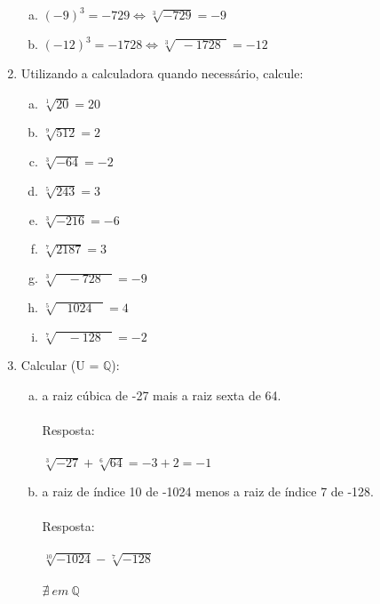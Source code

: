 \documentclass[a4paper,14pt]{article}
\begin{document}
\begin{multicols}{2}
\begin{enumerate}
\begin{enumerate}[a)]
        	\item $(-9)^3 = -729 \Leftrightarrow \sqrt[3]{-729} = -9$
        	\item $(-12)^3 = -1728 \Leftrightarrow \sqrt[3]{~~-1728~~} = -12$
        \end{enumerate}
        \item Utilizando a calculadora quando necessário, calcule:
        \begin{enumerate}[a)]
        	\item $\sqrt[1]{20} = 20$
        	\item $\sqrt[9]{512} = 2$
        	\item $\sqrt[3]{-64} = -2$
        	\item $\sqrt[5]{243} = 3$
        	\item $\sqrt[3]{-216} = -6$
        	\item $\sqrt[7]{2187} = 3$
        	\item $\sqrt[3]{~~~~-728~~~~} = -9$
        	\item $\sqrt[5]{~~~~1024~~~~} = 4$
        	\item $\sqrt[7]{~~~~-128~~~~} = -2$
        \end{enumerate}
        \item Calcular (U = $\mathbb{Q}$):
        \begin{enumerate}[a)]
           	\item a raiz cúbica de -27 mais a raiz sexta de 64. \\ \\
           	Resposta: \\ \\
           	$\sqrt[3]{-27} + \sqrt[6]{64} = -3 + 2 = -1$
           	\item a raiz de índice 10 de -1024 menos a raiz de índice 7 de -128. \\ \\
           		Resposta: \\ \\
           	$\sqrt[10]{-1024} - \sqrt[7]{-128}$ \\ \\
           	$\nexists~em~\mathbb{Q}$
        \end{enumerate}
        
        
    \end{enumerate}        
    \end{multicols}    
\end{document}
